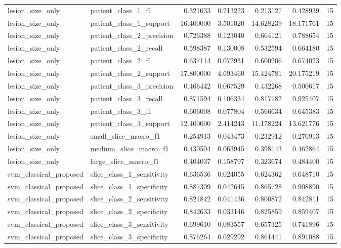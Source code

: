 \begin{tabular}{llrrrrr}
lesion_size_only & patient_class_1_f1 & 0.321033 & 0.213223 & 0.213127 & 0.428939 & 15 \\
lesion_size_only & patient_class_1_support & 16.400000 & 3.501020 & 14.628239 & 18.171761 & 15 \\
lesion_size_only & patient_class_2_precision & 0.726388 & 0.123040 & 0.664121 & 0.788654 & 15 \\
lesion_size_only & patient_class_2_recall & 0.598387 & 0.130008 & 0.532594 & 0.664180 & 15 \\
lesion_size_only & patient_class_2_f1 & 0.637114 & 0.072931 & 0.600206 & 0.674023 & 15 \\
lesion_size_only & patient_class_2_support & 17.800000 & 4.693460 & 15.424781 & 20.175219 & 15 \\
lesion_size_only & patient_class_3_precision & 0.466442 & 0.067529 & 0.432268 & 0.500617 & 15 \\
lesion_size_only & patient_class_3_recall & 0.871594 & 0.106334 & 0.817782 & 0.925407 & 15 \\
lesion_size_only & patient_class_3_f1 & 0.606008 & 0.077804 & 0.566634 & 0.645383 & 15 \\
lesion_size_only & patient_class_3_support & 12.400000 & 2.414243 & 11.178224 & 13.621776 & 15 \\
lesion_size_only & small_slice_macro_f1 & 0.254913 & 0.043473 & 0.232912 & 0.276913 & 15 \\
lesion_size_only & medium_slice_macro_f1 & 0.430504 & 0.063945 & 0.398143 & 0.462864 & 15 \\
lesion_size_only & large_slice_macro_f1 & 0.404037 & 0.158797 & 0.323674 & 0.484400 & 15 \\
svm_classical_proposed & slice_class_1_sensitivity & 0.636536 & 0.024055 & 0.624362 & 0.648710 & 15 \\
svm_classical_proposed & slice_class_1_specificity & 0.887309 & 0.042645 & 0.865728 & 0.908890 & 15 \\
svm_classical_proposed & slice_class_2_sensitivity & 0.821842 & 0.041436 & 0.800872 & 0.842811 & 15 \\
svm_classical_proposed & slice_class_2_specificity & 0.842633 & 0.033146 & 0.825859 & 0.859407 & 15 \\
svm_classical_proposed & slice_class_3_sensitivity & 0.699610 & 0.083557 & 0.657325 & 0.741896 & 15 \\
svm_classical_proposed & slice_class_3_specificity & 0.876264 & 0.029292 & 0.861441 & 0.891088 & 15 \\

\end{tabular}
